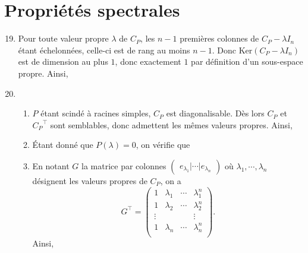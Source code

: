 \documentclass[a4paper,11pt]{article}
\begin{document}
\section{Propriétés spectrales}
\begin{enumerate}
\setcounter{enumi}{18}
\item Pour toute valeur propre $\lambda$ de $C_P$, les $n-1$ premières colonnes de $C_P-\lambda I_n$ étant échelonnées, celle-ci est de rang au moins $n-1$. Donc $\mathrm{Ker}(C_P-\lambda I_n)$ est de dimension au plus $1$, donc exactement $1$ par définition d'un sous-espace propre. Ainsi,
\begin{center}
\end{center}
\item 
\begin{enumerate}
\item $P$ étant scindé à racines simples, $C_P$ est diagonalisable. Dès lors $C_P$ et ${C_P}^\top$ sont semblables, donc admettent les mêmes valeurs propres. Ainsi,
\begin{center}
\end{center} 
\item Étant donné que $P(\lambda)=0$, on vérifie que 
\begin{center}
\end{center}
\item En notant $G$ la matrice par colonnes $\begin{pmatrix}
e_{\lambda_1}\vert\cdots\vert e_{\lambda_n}
\end{pmatrix}$ où $\lambda_1,\cdots,\lambda_n$ désignent les valeurs propres de $C_P$, on a 
\[G^\top=\begin{pmatrix}
1&\lambda_1&\cdots&\lambda_1^n\\
1&\lambda_2&\cdots&\lambda_2^n\\
\vdots&&&\vdots\\
1&\lambda_n&\cdots&\lambda_n^n\\
\end{pmatrix}.\]
Ainsi,
\begin{center}
\end{center}
\end{enumerate}
\end{enumerate}
\end{document}
